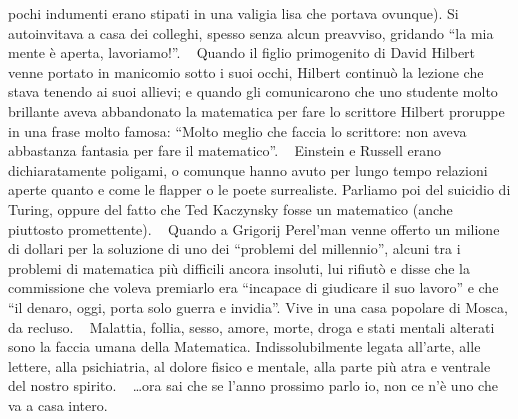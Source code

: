 pochi indumenti erano stipati in una valigia lisa che portava ovunque).
Si autoinvitava a casa dei colleghi, spesso senza alcun preavviso,
gridando ``la mia mente è aperta, lavoriamo!''. ~ Quando il figlio
primogenito di David Hilbert venne portato in manicomio sotto i suoi
occhi, Hilbert continuò la lezione che stava tenendo ai suoi allievi; e
quando gli comunicarono che uno studente molto brillante aveva
abbandonato la matematica per fare lo scrittore Hilbert proruppe in una
frase molto famosa: ``Molto meglio che faccia lo scrittore: non aveva
abbastanza fantasia per fare il matematico''. ~ Einstein e Russell erano
dichiaratamente poligami, o comunque hanno avuto per lungo tempo
relazioni aperte quanto e come le flapper o le poete surrealiste.
Parliamo poi del suicidio di Turing, oppure del fatto che Ted Kaczynsky
fosse un matematico (anche piuttosto promettente). ~ Quando a Grigorij
Perel'man venne offerto un milione di dollari per la soluzione di uno
dei ``problemi del millennio'', alcuni tra i problemi di matematica più
difficili ancora insoluti, lui rifiutò e disse che la commissione che
voleva premiarlo era ``incapace di giudicare il suo lavoro'' e che ``il
denaro, oggi, porta solo guerra e invidia''. Vive in una casa popolare
di Mosca, da recluso. ~ Malattia, follia, sesso, amore, morte, droga e
stati mentali alterati sono la faccia umana della Matematica.
Indissolubilmente legata all'arte, alle lettere, alla psichiatria, al
dolore fisico e mentale, alla parte più atra e ventrale del nostro
spirito. ~ \ldots ora sai che se l'anno prossimo parlo io, non ce n'è
uno che va a casa intero.
